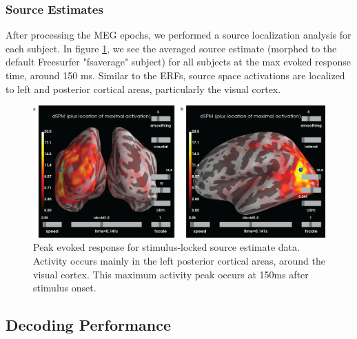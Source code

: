 \documentclass[../main.tex]{subfiles}
\begin{document}
\subsubsection{Source Estimates}
After processing the MEG epochs, we performed a source localization analysis for each subject. In figure \ref{source_max}, we see the averaged source estimate (morphed to the default Freesurfer "fsaverage" subject) for all subjects at the max evoked response time, around 150 ms. Similar to the ERFs, source space activations are localized to left and posterior cortical areas, particularly the visual cortex.

\begin{figure}
    \centering
    \includegraphics[scale=0.7]{figures/results/source_localiztion_results.png}
    \caption{Peak evoked response for stimulus-locked source estimate data. Activity occurs mainly in the left posterior cortical areas, around the visual cortex. This maximum activity peak occurs at 150ms after stimulus onset.}
    \label{source_max}
\end{figure}


\subsection{Decoding Performance}
\end{document}
